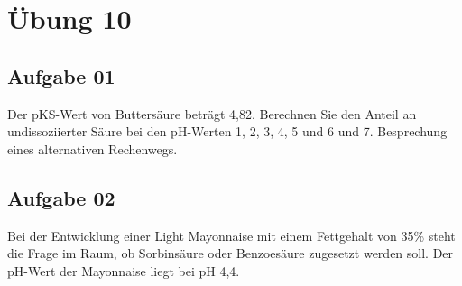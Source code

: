 \documentclass[a4paper,10pt]{article}
\begin{document}
\sidebar
{}
\par \vspace*{5mm}


\section*{Übung 10}

\subsection*{Aufgabe 01}
Der pKS-Wert von Buttersäure beträgt 4,82. Berechnen Sie den Anteil an undissoziierter Säure
bei den pH-Werten 1, 2, 3, 4, 5 und 6 und 7. Besprechung eines alternativen Rechenwegs.


\subsection*{Aufgabe 02}
Bei der Entwicklung einer Light Mayonnaise mit einem Fettgehalt von 35\% steht die Frage im
Raum, ob Sorbinsäure oder Benzoesäure zugesetzt werden soll. Der pH-Wert der Mayonnaise
liegt bei pH 4,4.
\end{document}
